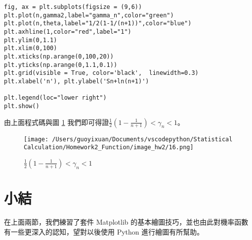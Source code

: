 \begin{itemize}
\begin{lstlisting}
fig, ax = plt.subplots(figsize = (9,6))
plt.plot(n,gamma2,label="gamma_n",color="green")
plt.plot(n,theta,label="1/2(1-1/(n+1))",color="blue")
plt.axhline(1,color="red",label="1")
plt.ylim(0,1.1)
plt.xlim(0,100)
plt.xticks(np.arange(0,100,20))
plt.yticks(np.arange(0,1.1,0.1))
plt.grid(visible = True, color='black',  linewidth=0.3)
plt.xlabel('n'), plt.ylabel('Sn+ln(n+1)')

plt.legend(loc="lower right")
plt.show()

\end{lstlisting}

由上面程式碼與圖 \ref{fig:gamma_n2} 我們即可得證$\frac{1}{2}(1-\frac{1}{n+1}) < \gamma_n < 1$。

\begin{figure}[H]
    \centering
        \texttt{[image: /Users/guoyixuan/Documents/vscodepython/Statistical Calculation/Homework2\_Function/image\_hw2/16.png]}
    \caption{$\frac{1}{2}(1-\frac{1}{n+1}) < \gamma_n < 1$}
    \label{fig:gamma_n2}
\end{figure}

\end{itemize}

\section{小結}

在上面兩節，我們練習了套件 Matplotlib 的基本繪圖技巧，並也由此對機率函數有一些更深入的認知，望對以後使用 Python 進行繪圖有所幫助。


